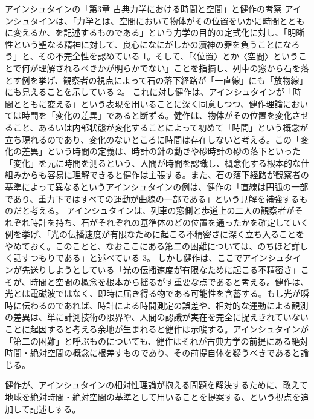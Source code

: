 \documentclass{article}
\begin{document}
アインシュタインの「第3章 古典力学における時間と空間」と健作の考察
アインシュタインは、「力学とは、空間において物体がその位置をいかに時間とともに変えるか、を記述するものである」という力学の目的の定式化に対し、「明晰性という聖なる精神に対して、良心になにがしかの瀆神の罪を負うことになろう」と、その不完全性を認めている 1。そして、「〈位置〉とか〈空間〉ということで何が理解されるべきかが明らかでない」ことを指摘し、列車の窓から石を落とす例を挙げ、観察者の視点によって石の落下経路が「一直線」にも「放物線」にも見えることを示している 2。
これに対し健作は、アインシュタインが「時間とともに変える」という表現を用いることに深く同意しつつ、健作理論においては時間を「変化の差異」であると断ずる。健作は、物体がその位置を変化させること、あるいは内部状態が変化することによって初めて「時間」という概念が立ち現れるのであり、変化のないところに時間は存在しないと考える。この「変化の差異」という時間の定義は、時計の針の動きや砂時計の砂の落下といった「変化」を元に時間を測るという、人間が時間を認識し、概念化する根本的な仕組みからも容易に理解できると健作は主張する。また、石の落下経路が観察者の基準によって異なるというアインシュタインの例は、健作の「直線は円弧の一部であり、重力下ではすべての運動が曲線の一部である」という見解を補強するものだと考える。
アインシュタインは、列車の窓側と歩道上の二人の観察者がそれぞれ時計を持ち、石がそれぞれの基準体のどの位置を通ったかを確定していく例を挙げ、「光の伝播速度が有限なために起こる不精密さに深く立ち入ることをやめておく。このことと、なおここにある第二の困難については、のちほど詳しく話すつもりである」と述べている 3。
しかし健作は、ここでアインシュタインが先送りしようとしている「光の伝播速度が有限なために起こる不精密さ」こそが、時間と空間の概念を根本から揺るがす重要な点であると考える。健作は、光とは電磁波ではなく、即時に届き得る物である可能性を含蓄する。もし光が瞬時に伝わるのであれば、時計による時間測定の誤差や、相対的な運動による観測の差異は、単に計測技術の限界や、人間の認識が実在を完全に捉えきれていないことに起因すると考える余地が生まれると健作は示唆する。アインシュタインが「第二の困難」と呼ぶものについても、健作はそれが古典力学の前提にある絶対時間・絶対空間の概念に根差すものであり、その前提自体を疑うべきであると論じる。



健作が、アインシュタインの相対性理論が抱える問題を解決するために、敢えて地球を絶対時間・絶対空間の基準として用いることを提案する、という視点を追加して記述しする。
\end{document}
